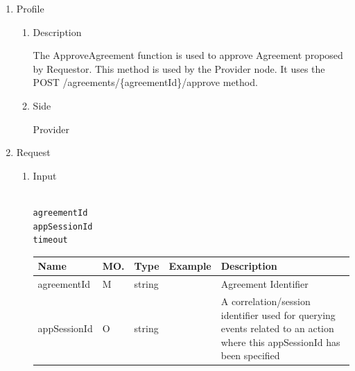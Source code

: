 \begin{enumerate}

\item Profile

\begin{enumerate}

\item Description

The ApproveAgreement function is used to approve Agreement proposed by Requestor. This method is used by the Provider node. 
It uses the POST /agreements/\{agreementId\}/approve method.

\item Side

Provider

\end{enumerate}

\item Request

\begin{enumerate}

\item Input

\begin{tcolorbox}[boxrule=0pt, frame empty]
\begin{verbatim}

agreementId
appSessionId
timeout

\end{verbatim}
\end{tcolorbox}


\begin{center}
\begin{tabular}{|p{3cm}|l|p{3cm}|p{3cm}|p{4cm}|} 
\hline
\rowcolor{lightgray}	Name	& MO.	& Type	& Example & 	Description \\
\hline

agreementId		& M & 	string				&		& 	Agreement Identifier \\
\hline

appSessionId	& O	& 	string				&		&	A correlation/session identifier used for querying events related to an action where this appSessionId has been specified 	\\ 
\hline


\end{tabular}
\end{center}
\end{enumerate}
\end{enumerate}
